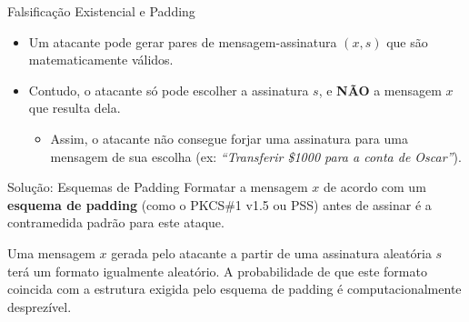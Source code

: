 \documentclass{beamer}
\begin{document}
\begin{frame}{Falsificação Existencial e Padding}
    \begin{itemize}
        \item Um atacante pode gerar pares de mensagem-assinatura $(x,s)$ que são matematicamente válidos.
        
        \item Contudo, o atacante só pode escolher a assinatura $s$, e \textbf{NÃO} a mensagem $x$ que resulta dela.
        \begin{itemize}
            \item[$\Rightarrow$] Assim, o atacante não consegue forjar uma assinatura para uma mensagem de sua escolha (ex: \textit{``Transferir \$1000 para a conta de Oscar''}).
        \end{itemize}
    \end{itemize}

    \pause
    \vspace{1em}

    \begin{block}{Solução: Esquemas de Padding}
        Formatar a mensagem $x$ de acordo com um \textbf{esquema de padding} (como o PKCS\#1 v1.5 ou PSS) antes de assinar é a contramedida padrão para este ataque.
    \end{block}
    
    \footnotesize Uma mensagem $x$ gerada pelo atacante a partir de uma assinatura aleatória $s$ terá um formato igualmente aleatório. A probabilidade de que este formato coincida com a estrutura exigida pelo esquema de padding é computacionalmente desprezível.
\end{frame}
\end{document}
